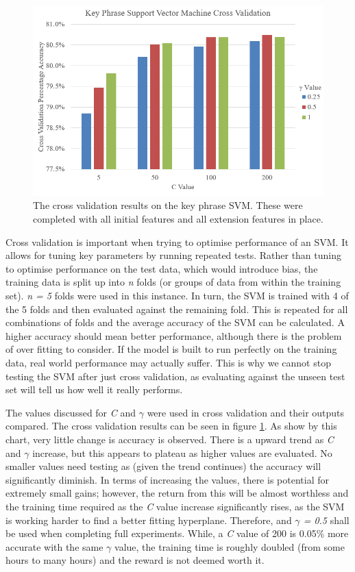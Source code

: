 \begin{figure}
	\includegraphics[width=\textwidth]{img/kpsvmcrossvalidation.png}
	\caption[Key Phrase SVM Cross Validation]{The cross validation results on the key phrase SVM. These were completed with all initial features and all extension features in place.}
	\label{figure:kpsvmcv}
\end{figure}

Cross validation is important when trying to optimise performance of an SVM. It allows for tuning key parameters by running repeated tests. Rather than tuning to optimise performance on the test data, which would introduce bias, the training data is split up into \textit{n} folds (or groups of data from within the training set). \textit{n = 5} folds were used in this instance. In turn, the SVM is trained with 4 of the 5 folds and then evaluated against the remaining fold. This is repeated for all combinations of folds and the average accuracy of the SVM can be calculated. A higher accuracy should mean better performance, although there is the problem of over fitting to consider. If the model is built to run perfectly on the training data, real world performance may actually suffer. This is why we cannot stop testing the SVM after just cross validation, as evaluating against the unseen test set will tell us how well it really performs. 

The values discussed for \textit{C} and $\gamma$ were used in cross validation and their outputs compared. The cross validation results can be seen in figure \ref{figure:kpsvmcv}. As show by this chart, very little change is accuracy is observed. There is a upward trend as \textit{C} and $\gamma$ increase, but this appears to plateau as higher values are evaluated. No smaller values need testing as (given the trend continues) the accuracy will significantly diminish. In terms of increasing the values, there is potential for extremely small gains; however, the return from this will be almost worthless and the training time required as the \textit{C} value increase significantly rises, as the SVM is working harder to find a better fitting hyperplane. Therefore,  and \textit{$\gamma$ = 0.5} shall be used when completing full experiments. While, a \textit{C} value of 200 is 0.05\% more accurate with the same $\gamma$ value, the training time is roughly doubled (from some hours to many hours) and the reward is not deemed worth it.

